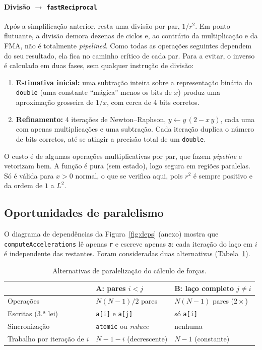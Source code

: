 \documentclass[conference]{IEEEtran}
\begin{document}
\paragraph{Divisão $\to$ \texttt{fastReciprocal}}
Após a simplificação anterior, resta uma divisão por par, $1/r^2$. Em ponto flutuante, a divisão demora dezenas de ciclos e, ao contrário da multiplicação e da FMA, não é totalmente \textit{pipelined}. Como todas as operações seguintes dependem do seu resultado, ela fica no caminho crítico de cada par. Para a evitar, o inverso é calculado em duas fases, sem qualquer instrução de divisão:
\begin{enumerate}
  \item \textbf{Estimativa inicial:} uma subtração inteira sobre a representação binária do \texttt{double} (uma constante ``mágica'' menos os bits de $x$) produz uma aproximação grosseira de $1/x$, com cerca de 4 bits corretos.
  \item \textbf{Refinamento:} 4 iterações de Newton--Raphson, $y \leftarrow y\,(2 - x\,y)$, cada uma com apenas multiplicações e uma subtração. Cada iteração duplica o número de bits corretos, até se atingir a precisão total de um \texttt{double}.
\end{enumerate}
O custo é de algumas operações multiplicativas por par, que fazem \textit{pipeline} e vetorizam bem. A função é pura (sem estado), logo segura em regiões paralelas. Só é válida para $x>0$ normal, o que se verifica aqui, pois $r^2$ é sempre positivo e da ordem de $1$ a $L^2$.

\subsection{Oportunidades de paralelismo}
O diagrama de dependências da Figura~\ref{fig:deps} (anexo) mostra que \texttt{computeAccelerations} lê apenas \texttt{r} e escreve apenas \texttt{a}: cada iteração do laço em $i$ é independente das restantes. Foram consideradas duas alternativas (Tabela~\ref{tab:alt}).

\begin{table}[h]
\centering\small
\caption{Alternativas de paralelização do cálculo de forças.}\label{tab:alt}
\begin{tabular}{p{2.3cm}p{2.5cm}p{2.5cm}}
\toprule
 & \textbf{A: pares $i<j$} & \textbf{B: laço completo $j\neq i$} \\
\midrule
Operações & $N(N-1)/2$ pares & $N(N-1)$ pares ($2\times$) \\
Escritas (3.ª lei) & \texttt{a[i]} e \texttt{a[j]} & só \texttt{a[i]} \\
Sincronização & \texttt{atomic} ou \textit{reduce} & nenhuma \\
Trabalho por iteração de $i$ & $N{-}1{-}i$ (decrescente) & $N{-}1$ (constante) \\
\bottomrule
\end{tabular}
\end{table}
\end{document}
